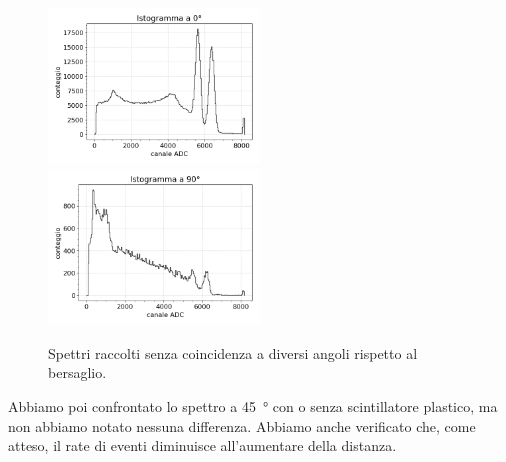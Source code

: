 \begin{figure}[h]
	\centering
	\newcommand*\mywidth{0.5\textwidth}

	\subfloat
	{\includegraphics[width=\mywidth]{0g}}
	\hfill
	\subfloat
	{\includegraphics[width=\mywidth]{90g}}

	\caption{Spettri raccolti senza coincidenza a diversi angoli rispetto al bersaglio.}
	\label{4ang}
\end{figure}

Abbiamo poi confrontato lo spettro a \SI{45}{\degree} con o senza scintillatore plastico, ma non abbiamo notato nessuna differenza. Abbiamo anche verificato che, come atteso, il rate di eventi diminuisce all'aumentare della distanza.

